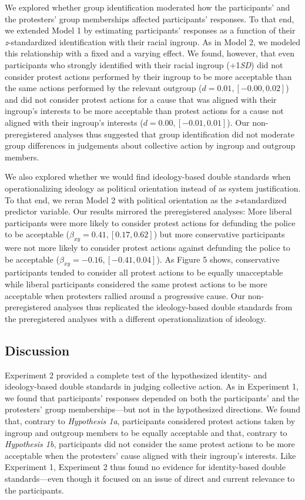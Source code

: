 \documentclass[twocolumn, 11pt, letterpaper]{article}
\begin{document}
We explored whether group identification moderated how the participants'
and the protesters' group memberships affected participants' responses.
To that end, we extended Model 1 by estimating participants' responses
as a function of their \emph{z}-standardized identification with their
racial ingroup. As in Model 2, we modeled this relationship with a fixed
and a varying effect. We found, however, that even participants who
strongly identified with their racial ingroup (+1\emph{SD}) did not
consider protest actions performed by their ingroup to be more
acceptable than the same actions performed by the relevant outgroup
(\(d = 0.01, [-0.00, 0.02]\)) and did not consider protest actions for a
cause that was aligned with their ingroup's interests to be more
acceptable than protest actions for a cause not aligned with their
ingroup's interests (\(d = 0.00, [-0.01, 0.01]\)). Our non-preregistered
analyses thus suggested that group identification did not moderate group
differences in judgements about collective action by ingroup and
outgroup members.

We also explored whether we would find ideology-based double standards
when operationalizing ideology as political orientation instead of as
system justification. To that end, we reran Model 2 with political
orientation as the \emph{z}-standardized predictor variable. Our results
mirrored the preregistered analyses: More liberal participants were more
likely to consider protest actions for defunding the police to be
acceptable (\(\beta_{xy} = 0.41, [0.17, 0.62]\)) but more conservative
participants were not more likely to consider protest actions against
defunding the police to be acceptable
(\(\beta_{xy} = -0.16, [-0.41, 0.04]\)). As Figure 5 shows, conservative
participants tended to consider all protest actions to be equally
unacceptable while liberal participants considered the same protest
actions to be more acceptable when protesters rallied around a
progressive cause. Our non-preregistered analyses thus replicated the
ideology-based double standards from the preregistered analyses with a
different operationalization of ideology.

\hypertarget{discussion-1}{%
\subsection{Discussion}\label{discussion-1}}

Experiment 2 provided a complete test of the hypothesized identity- and
ideology-based double standards in judging collective action. As in
Experiment 1, we found that participants' responses depended on both the
participants' and the protesters' group memberships---but not in the
hypothesized directions. We found that, contrary to \emph{Hypothesis
1a}, participants considered protest actions taken by ingroup and
outgroup members to be equally acceptable and that, contrary to
\emph{Hypothesis 1b}, participants did not consider the same protest
actions to be more acceptable when the protesters' cause aligned with
their ingroup's interests. Like Experiment 1, Experiment 2 thus found no
evidence for identity-based double standards---even though it focused on
an issue of direct and current relevance to the participants.
\end{document}
